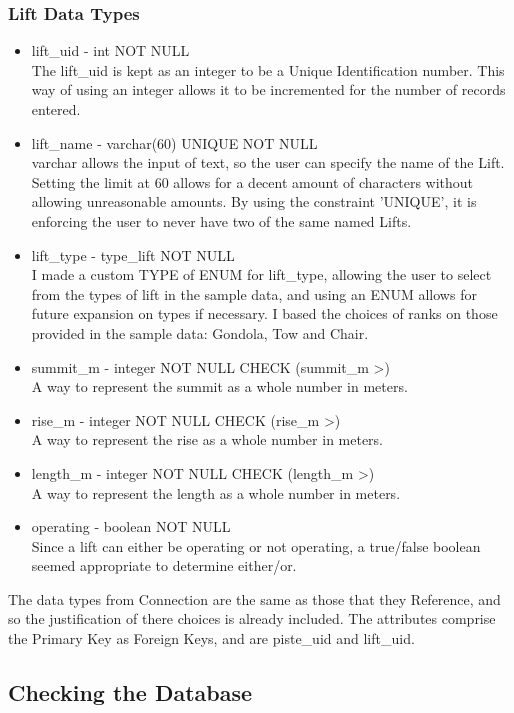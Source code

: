 \documentclass[11pt]{scrartcl} %
\begin{document}
\subsubsection{Lift Data Types}
\begin{itemize}
\item lift\_uid - int NOT NULL\\
The lift\_uid is kept as an integer to be a Unique Identification number. This way of using an integer allows it to be incremented for the number of records entered.
\item lift\_name - varchar(60) UNIQUE NOT NULL\\
varchar allows the input of text, so the user can specify the name of the Lift. Setting the limit at 60 allows for a decent amount of characters without allowing unreasonable amounts. By using the constraint 'UNIQUE', it is enforcing the user to never have two of the same named Lifts.
\item lift\_type - type\_lift NOT NULL\\
I made a custom TYPE of ENUM for lift\_type, allowing the user to select from the types of lift in the sample data, and using an ENUM allows for future expansion on types if necessary. I based the choices of ranks on those provided in the sample data: Gondola, Tow and Chair.
\item summit\_m - integer NOT NULL CHECK (summit\_m \textgreater {})\\
A way to represent the summit as a whole number in meters.
\item rise\_m - integer NOT NULL CHECK (rise\_m \textgreater {})\\
A way to represent the rise as a whole number in meters.
\item length\_m - integer NOT NULL CHECK (length\_m \textgreater {})\\
A way to represent the length as a whole number in meters.
\item operating - boolean NOT NULL\\
Since a lift can either be operating or not operating, a true/false boolean seemed appropriate to determine either/or.
\end{itemize}

The data types from Connection are the same as those that they Reference, and so the justification of there choices is already included. The attributes comprise the Primary Key as Foreign Keys, and are piste\_uid and lift\_uid.

\newpage
\subsection{Checking the Database}
\end{document}
